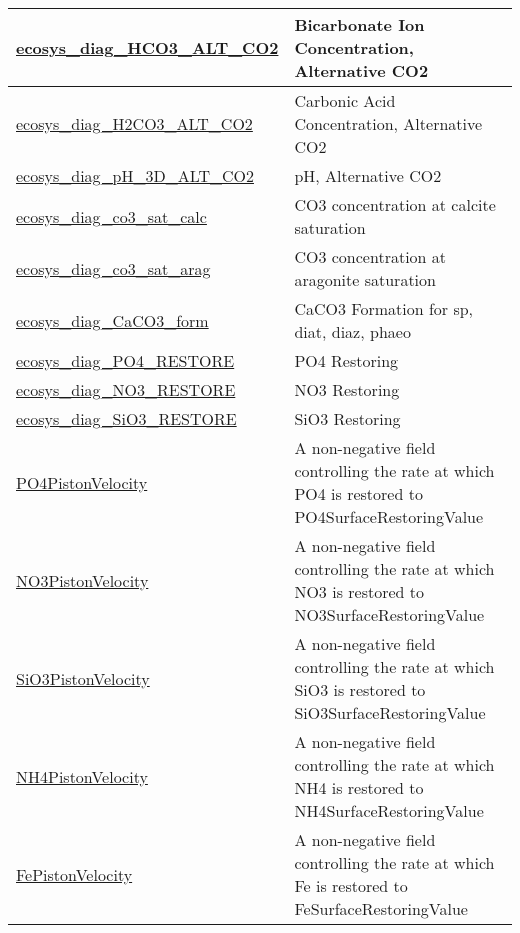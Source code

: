 {\begin{center}
\begin{longtable}{| p{2.0in} | p{4.0in} |}
    \hline
    \hyperref[subsec:var_sec_forcing_ecosys_diag_HCO3_ALT_CO2]{ecosys\_diag\_HCO3\_ALT\_CO2} & Bicarbonate Ion Concentration, Alternative CO2 \\
    \hline
    \hyperref[subsec:var_sec_forcing_ecosys_diag_H2CO3_ALT_CO2]{ecosys\_diag\_H2CO3\_ALT\_\-CO2} & Carbonic Acid Concentration, Alternative CO2 \\
    \hline
    \hyperref[subsec:var_sec_forcing_ecosys_diag_pH_3D_ALT_CO2]{ecosys\_diag\_pH\_3D\_ALT\_\-CO2} & pH, Alternative CO2 \\
    \hline
    \hyperref[subsec:var_sec_forcing_ecosys_diag_co3_sat_calc]{ecosys\_diag\_co3\_sat\_calc} & CO3 concentration at calcite saturation \\
    \hline
    \hyperref[subsec:var_sec_forcing_ecosys_diag_co3_sat_arag]{ecosys\_diag\_co3\_sat\_arag} & CO3 concentration at aragonite saturation \\
    \hline
    \hyperref[subsec:var_sec_forcing_ecosys_diag_CaCO3_form]{ecosys\_diag\_CaCO3\_form} & CaCO3 Formation for sp, diat, diaz, phaeo \\
    \hline
    \hyperref[subsec:var_sec_forcing_ecosys_diag_PO4_RESTORE]{ecosys\_diag\_PO4\_RESTORE} & PO4 Restoring \\
    \hline
    \hyperref[subsec:var_sec_forcing_ecosys_diag_NO3_RESTORE]{ecosys\_diag\_NO3\_RESTORE} & NO3 Restoring \\
    \hline
    \hyperref[subsec:var_sec_forcing_ecosys_diag_SiO3_RESTORE]{ecosys\_diag\_SiO3\_RESTORE} & SiO3 Restoring \\
    \hline
    \hyperref[subsec:var_sec_forcing_PO4PistonVelocity]{PO4PistonVelocity} & A non-negative field controlling the rate at which PO4 is restored to PO4SurfaceRestoringValue \\
    \hline
    \hyperref[subsec:var_sec_forcing_NO3PistonVelocity]{NO3PistonVelocity} & A non-negative field controlling the rate at which NO3 is restored to NO3SurfaceRestoringValue \\
    \hline
    \hyperref[subsec:var_sec_forcing_SiO3PistonVelocity]{SiO3PistonVelocity} & A non-negative field controlling the rate at which SiO3 is restored to SiO3SurfaceRestoringValue \\
    \hline
    \hyperref[subsec:var_sec_forcing_NH4PistonVelocity]{NH4PistonVelocity} & A non-negative field controlling the rate at which NH4 is restored to NH4SurfaceRestoringValue \\
    \hline
    \hyperref[subsec:var_sec_forcing_FePistonVelocity]{FePistonVelocity} & A non-negative field controlling the rate at which Fe is restored to FeSurfaceRestoringValue \\

\end{longtable}
\end{center}}
